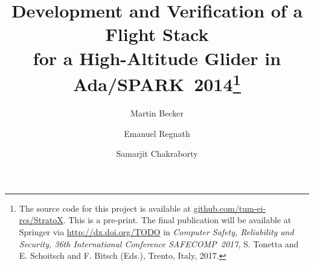 \documentclass[oneside,a4paper,10pt]{llncs}
\begin{document}

\title{Development and Verification of a Flight Stack\\for a High-Altitude Glider in Ada/SPARK~2014\thanks{The source code for this project is available at \url{github.com/tum-ei-rcs/StratoX}. This is a pre-print. The final publication will be available at Springer via \url{http://dx.doi.org/TODO} in \emph{Computer Safety, Reliability and Security, 36th International Conference SAFECOMP~2017}, S. Tonetta and E. Schoitsch and F. Bitsch (Eds.), Trento, Italy, 2017.}}
%
%
\author{\vspace*{-1em}Martin Becker \and Emanuel Regnath \and Samarjit Chakraborty}
%
%
%

\maketitle              %
\end{document}
